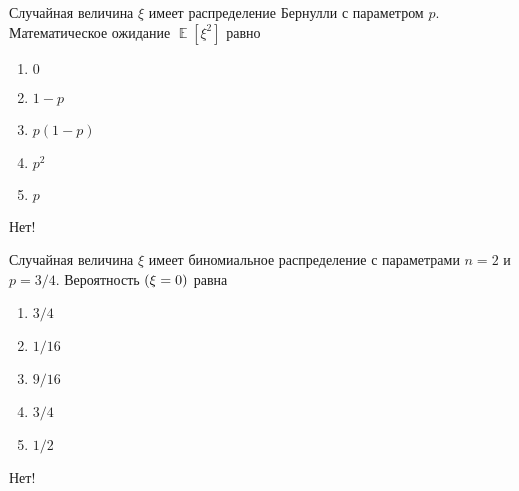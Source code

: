 \documentclass[t]{beamer}
\DeclareMathOperator{\E}{\mathbb{E}}
\let\P\relax
\DeclareMathOperator{\P}{\mathbb{P}}
\begin{document}
 \begin{frame} \label{25-No} 
\begin{block}{25} 

Случайная величина $\xi$ имеет распределение Бернулли с параметром $p$. Математическое ожидание $\E[\xi^2]$ равно
  


 \end{block} 
\begin{enumerate} 
\item[] \hyperlink{25-No}{\beamergotobutton{} $0$}
\item[] \hyperlink{25-No}{\beamergotobutton{} $1-p$}
\item[] \hyperlink{25-No}{\beamergotobutton{} $p(1-p)$}
\item[] \hyperlink{25-No}{\beamergotobutton{} $p^2$}
\item[] \hyperlink{25-Yes}{\beamergotobutton{} $p$}
\end{enumerate} 

 \alert{Нет!} 
\end{frame} 


 \begin{frame} \label{26-No} 
\begin{block}{26} 

Случайная величина $\xi$ имеет биномиальное распределение с параметрами $n = 2$ и $p = 3/4$. Вероятность $\P(\xi = 0)$ равна
  


 \end{block} 
\begin{enumerate} 
\item[] \hyperlink{26-No}{\beamergotobutton{} $3/4$}
\item[] \hyperlink{26-Yes}{\beamergotobutton{} $1/16$}
\item[] \hyperlink{26-No}{\beamergotobutton{} $9/16$}
\item[] \hyperlink{26-No}{\beamergotobutton{} $3/4$}
\item[] \hyperlink{26-No}{\beamergotobutton{} $1/2$}
\end{enumerate} 

 \alert{Нет!} 
\end{frame} 
\end{document}
